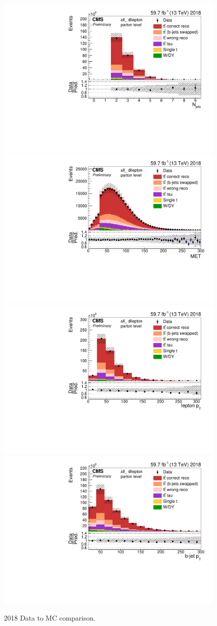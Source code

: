 \begin{figure}[h]
    \centering
    \includegraphics[width=.44\linewidth]{control/18_all_Njets.pdf}
    \includegraphics[width=.44\linewidth]{control/18_all_MET.pdf}
    \includegraphics[width=.44\linewidth]{control/18_all_lep_pt.pdf}
    \includegraphics[width=.44\linewidth]{control/18_all_bj_Pt.pdf}
    \caption{2018 Data to MC comparison. }
    \label{fig:dmcpost_18}
\end{figure}



